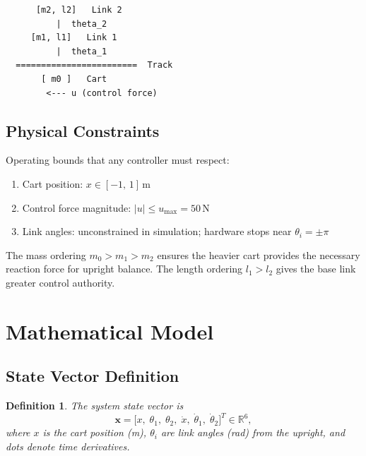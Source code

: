 \documentclass[11pt,a4paper]{article}
\newtheorem{definition}{Definition}[section]
\begin{document}
\begin{center}
\begin{verbatim}
      [m2, l2]   Link 2
          |  theta_2
     [m1, l1]   Link 1
          |  theta_1
  ========================  Track
       [ m0 ]   Cart
        <--- u (control force)
\end{verbatim}
\end{center}

\subsection{Physical Constraints}

Operating bounds that any controller must respect:

\begin{enumerate}
    \item Cart position: $x \in [-1,\, 1]\,\mathrm{m}$
    \item Control force magnitude: $|u| \leq u_{\max} = 50\,\mathrm{N}$
    \item Link angles: unconstrained in simulation; hardware stops near
          $\theta_i = \pm\pi$
\end{enumerate}

The mass ordering $m_0 > m_1 > m_2$ ensures the heavier cart provides the
necessary reaction force for upright balance.  The length ordering $l_1 > l_2$
gives the base link greater control authority.

\section{Mathematical Model}
\label{sec:model}

\subsection{State Vector Definition}

\begin{definition}
The system state vector is
\begin{equation}
    \mathbf{x} =
    \bigl[x,\;\theta_1,\;\theta_2,\;\dot{x},\;\dot{\theta}_1,\;
    \dot{\theta}_2\bigr]^{T} \in \mathbb{R}^{6},
\end{equation}
where $x$ is the cart position (m), $\theta_i$ are link angles (rad) from the
upright, and dots denote time derivatives.
\end{definition}
\end{document}
